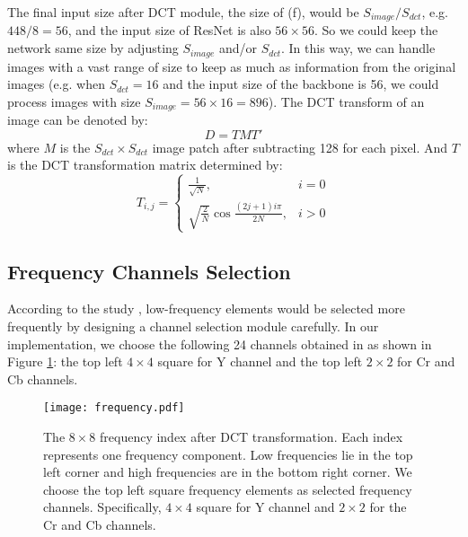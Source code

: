 \documentclass[10pt, conference, compsocconf]{IEEEtran}
\begin{document}
The final input size after DCT module, the size of (f), would be $S_{image}/S_{dct}$, e.g. $448/8 = 56$, and the input size of ResNet is also $56\times 56$. So we could keep the network same size by adjusting $S_{image}$ and/or $S_{dct}$. In this way, we can handle images with a vast range of size to keep as much as information from the original images (e.g. when $S_{dct} = 16$ and the input size of the backbone is 56, we could process images with size $S_{image} = 56\times 16 = {}{896}$).  The DCT transform of an image can be denoted by:  \begin{equation}
D = TMT'
\end{equation}
\noindent
where $M$ is the $S_{dct}\times S_{dct}$ image patch after subtracting 128 for each pixel. And $T$ is the DCT transformation matrix determined by:
\begin{equation}
T_{i,j}=\left\{\begin{matrix}
\frac{1}{\sqrt{N}}, & i=0 \\ 
\sqrt{\frac{2}{N}}\cos\frac{(2j+1)i\pi}{2N}, & i>0
\end{matrix}\right.
\end{equation}

\subsection{Frequency Channels Selection}

According to the study \cite{XuKai2020}, low-frequency elements would be selected more frequently by designing a channel selection module carefully. In our implementation, we choose the following 24 channels {}{obtained in} \cite{XuKai2020} as shown in Figure \ref{fig3}: the top left $4\times 4$ square for Y channel and the top left $2\times 2$ for Cr and Cb channels.

\begin{figure}[t]
\begin{center}
    \texttt{[image: frequency.pdf]}\end{center}
\caption{The $8 \times 8$ frequency index after DCT transformation. Each index represents one frequency component. Low frequencies lie in the top left corner and high frequencies are in the bottom right corner. We choose the top left square frequency elements as selected frequency channels. Specifically, $4\times 4$ square for Y channel and $2\times 2$ for the Cr and Cb channels. }
\label{fig3}
\end{figure}
\end{document}
